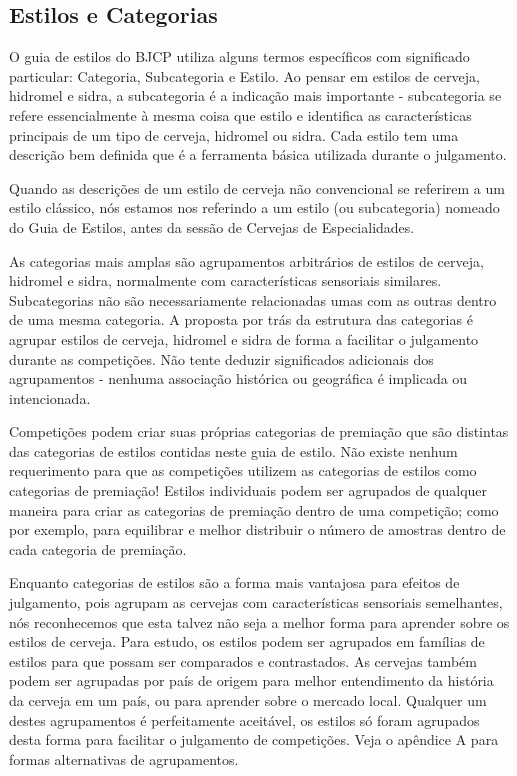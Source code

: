 \subsection*{Estilos e Categorias}
O guia de estilos do BJCP utiliza alguns termos específicos com significado particular: Categoria, Subcategoria e Estilo. Ao pensar em estilos de cerveja, hidromel e sidra, a subcategoria é a indicação mais importante - subcategoria se refere essencialmente à mesma coisa que estilo e identifica as características principais de um tipo de cerveja, hidromel ou sidra. Cada estilo tem uma descrição bem definida que é a ferramenta básica utilizada durante o julgamento.

Quando as descrições de um estilo de cerveja não convencional se referirem a um estilo clássico, nós estamos nos referindo a um estilo (ou subcategoria) nomeado do Guia de Estilos, antes da sessão de Cervejas de Especialidades.

As categorias mais amplas são agrupamentos arbitrários de estilos de cerveja, hidromel e sidra, normalmente com características sensoriais similares. Subcategorias não são necessariamente relacionadas umas com as outras dentro de uma mesma categoria. A proposta por trás da estrutura das categorias é agrupar estilos de cerveja, hidromel e sidra de forma a facilitar o julgamento durante as competições. Não tente deduzir significados adicionais dos agrupamentos - nenhuma associação histórica ou geográfica é implicada ou intencionada.

Competições podem criar suas próprias categorias de premiação que são distintas das categorias de estilos contidas neste guia de estilo. Não existe nenhum requerimento para que as competições utilizem as categorias de estilos como categorias de premiação! Estilos individuais podem ser agrupados de qualquer maneira para criar as categorias de premiação dentro de uma competição; como por exemplo, para equilibrar e melhor distribuir o número de amostras dentro de cada categoria de premiação.

Enquanto categorias de estilos são a forma mais vantajosa para efeitos de julgamento, pois agrupam as cervejas com características sensoriais semelhantes, nós reconhecemos que esta talvez não seja a melhor forma para aprender sobre os estilos de cerveja. Para estudo, os estilos podem ser agrupados em famílias de estilos para que possam ser comparados e contrastados. As cervejas também podem ser agrupadas por país de origem para melhor entendimento da história da cerveja em um país, ou para aprender sobre o mercado local. Qualquer um destes agrupamentos é perfeitamente aceitável, os estilos só foram agrupados desta forma para facilitar o julgamento de competições. Veja o apêndice A para formas alternativas de agrupamentos.